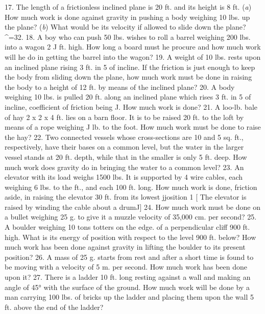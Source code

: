 17. The length of a frictionless inclined plane is 20 ft. and its height is 8 ft. (\emph{a}) How much work is done against gravity in pushing a body weighing 10 lbs. up the plane? (\emph{b}) What would be its velocity if allowed to slide down the plane? ^=32.
18. A boy who can push 50 lbs. wishes to roll a barrel weighing 200 lbs. into a wagon 2 J ft. high. How long a board must he procure and how much work will he do in getting the barrel into the wagon?
19. A weight of 10 lbs. rests upon an inclined plane rising 3 ft. in 5 of incline. If the friction is just enough to keep the body from sliding down the plane, how much work must be done in raising the body to a height of 12 ft. by means of the inclined plane?
20. A body weighing 10 lbs. is pulled 20 ft. along an inclined plane which rises 3 ft. in 5 of incline, coefficient of friction being J. How much work is done?
21. A loo-lb. bale of hay 2 x 2 x 4 ft. lies on a barn floor. It is to be raised 20 ft. to the loft by means of a rope weighing J lb. to the foot. How much work must be done to raise the hay?
22. Two connected vessels whose cross-sections are 10 and 5 sq. ft., respectively, have their bases on a common level, but the water in the larger vessel stands at 20 ft. depth, while that in the smaller is only 5 ft. deep. How much work does gravity do in bringing the water to a common level?
23. An elevator with its load weighs 1500 lbs. It is supported by 4 wire cables, each weighing 6 lbs. to the ft., and each 100 ft. long. How much work is done, friction aside, in raising the elevator 30 ft. from its lowest jjosition 1 [ The elevator is raised by winding the cable about a drumJ]
24. How much work must be done on a bullet weighing 25 g. to give it a muzzle velocity of 35,000 cm. per second?
25. A boulder weighing 10 tons totters on the edge. of a perpendicular cliff 900 ft. high. What is its energy of position with respect to the level 900 ft. below? How much work has been done against gravity in lifting the boulder to its present position?
26. A mass of 25 g. starts from rest and after a short time is found to be moving with a velocity of 5 m. per second. How much work has been done upon it?
27. There is a ladder 10 ft. long resting against a wall and making an angle of 45° with the surface of the ground. How much work will be done by a man carrying 100 lbs. of bricks up the ladder and placing them upon the wall 5 ft. above the end of the ladder?